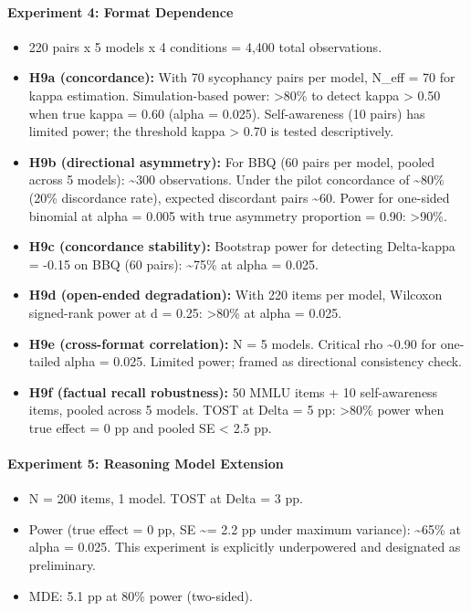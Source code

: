 \documentclass[
  11pt,
]{article}
\providecommand{\tightlist}{%
  \setlength{\itemsep}{0pt}\setlength{\parskip}{0pt}}
\begin{document}
\paragraph{Experiment 4: Format
Dependence}\label{experiment-4-format-dependence}

\begin{itemize}
\tightlist
\item
  220 pairs x 5 models x 4 conditions = 4,400 total observations.
\item
  \textbf{H9a (concordance):} With 70 sycophancy pairs per model, N\_eff
  = 70 for kappa estimation. Simulation-based power: \textgreater80\% to
  detect kappa \textgreater{} 0.50 when true kappa = 0.60 (alpha =
  0.025). Self-awareness (10 pairs) has limited power; the threshold
  kappa \textgreater{} 0.70 is tested descriptively.
\item
  \textbf{H9b (directional asymmetry):} For BBQ (60 pairs per model,
  pooled across 5 models): \textasciitilde300 observations. Under the
  pilot concordance of \textasciitilde80\% (20\% discordance rate),
  expected discordant pairs \textasciitilde60. Power for one-sided
  binomial at alpha = 0.005 with true asymmetry proportion = 0.90:
  \textgreater90\%.
\item
  \textbf{H9c (concordance stability):} Bootstrap power for detecting
  Delta-kappa = -0.15 on BBQ (60 pairs): \textasciitilde75\% at alpha =
  0.025.
\item
  \textbf{H9d (open-ended degradation):} With 220 items per model,
  Wilcoxon signed-rank power at d = 0.25: \textgreater80\% at alpha =
  0.025.
\item
  \textbf{H9e (cross-format correlation):} N = 5 models. Critical rho
  \textasciitilde0.90 for one-tailed alpha = 0.025. Limited power;
  framed as directional consistency check.
\item
  \textbf{H9f (factual recall robustness):} 50 MMLU items + 10
  self-awareness items, pooled across 5 models. TOST at Delta = 5 pp:
  \textgreater80\% power when true effect = 0 pp and pooled SE
  \textless{} 2.5 pp.
\end{itemize}

\paragraph{Experiment 5: Reasoning Model
Extension}\label{experiment-5-reasoning-model-extension-1}

\begin{itemize}
\tightlist
\item
  N = 200 items, 1 model. TOST at Delta = 3 pp.
\item
  Power (true effect = 0 pp, SE \textasciitilde= 2.2 pp under maximum
  variance): \textasciitilde65\% at alpha = 0.025. This experiment is
  explicitly underpowered and designated as preliminary.
\item
  MDE: 5.1 pp at 80\% power (two-sided).
\end{itemize}
\end{document}
